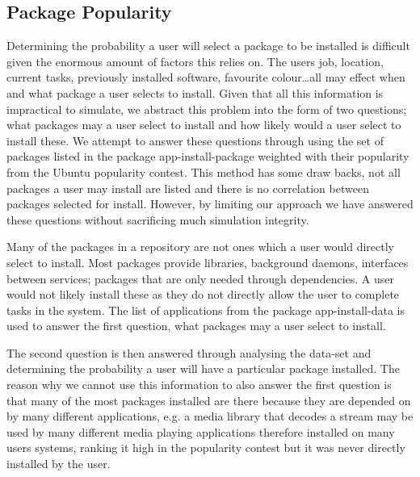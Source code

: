 


\subsection{Package Popularity}
{}Determining the probability a user will select a package to be installed is difficult given the enormous amount of factors this relies on.
{}The users job, location, current tasks, previously installed software, favourite colour\ldots all may effect when and what package a user selects to install.
{}Given that all this information is impractical to simulate, we abstract this problem into the form of two questions;
{}what packages may a user select to install and how likely would a user select to install these.
{}We attempt to answer these questions through using the set of packages listed in the package app-install-package
{}weighted with their popularity from the Ubuntu popularity contest.
{}This method has some draw backs, not all packages a user may install are listed and there is no correlation between packages selected for install.
{}However, by limiting our approach we have answered these questions without sacrificing much simulation integrity.

Many of the packages in a repository are not ones which a user would directly select to install.
Most packages provide libraries, background daemons, interfaces between services; packages that are only needed through dependencies.
A user would not likely install these as they do not directly allow the user to complete tasks in the system.
The list of applications from the package app-install-data is used to answer the first question, what packages may a user select to install.

The second question is then answered through analysing the data-set and determining the probability a user will have a particular package installed.
The reason why we cannot use this information to also answer the first question is that many of the most packages installed are there because they are depended on by many different applications,
e.g. a media library that decodes a stream may be used by many different media playing applications therefore installed on many users systems, 
ranking it high in the popularity contest but it was never directly installed by the user.


